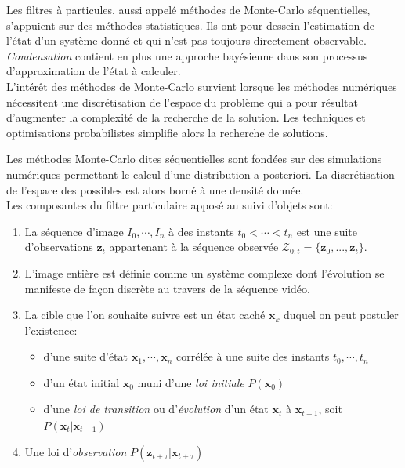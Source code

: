 \documentclass[a4paper,12pt]{report}
\begin{document}
Les filtres à particules, aussi appelé méthodes  de Monte-Carlo séquentielles, s'appuient sur des méthodes statistiques. Ils ont pour dessein l'estimation de l'état d'un système donné et qui n'est pas toujours directement observable.
\textit{Condensation} contient en plus une approche bayésienne dans son processus d'approximation de l'état à calculer.\\

L'intérêt des méthodes de Monte-Carlo survient lorsque les méthodes numériques nécessitent une discrétisation de l'espace du problème qui a pour résultat d'augmenter la complexité de la recherche de la solution. Les techniques et optimisations probabilistes simplifie alors la recherche de solutions.

Les méthodes Monte-Carlo dites séquentielles sont fondées sur des simulations numériques permettant le calcul d'une distribution a posteriori. La discrétisation de l'espace des possibles est alors borné à une densité donnée.\\

Les composantes du filtre particulaire apposé au suivi d'objets sont:
\begin{enumerate}
\item La séquence d'image $I_0,\cdots,I_n$ à des instants $t_0<\cdots<t_n$ est une suite d'observations $\mathbf{z}_t$ appartenant à la séquence observée $ \mathcal{Z}_{0:t}=\{\mathbf{z}_0,...,\mathbf{z}_t\}$.
\item[] L'image entière est définie comme un système complexe dont l'évolution se manifeste de façon discrète au travers de la séquence vidéo.
\item La cible que l'on souhaite suivre est un état caché $\mathbf{x}_k$ duquel on peut postuler l'existence:
	\begin{itemize}
	\item d'une suite d'état $\mathbf{x}_1,\cdots,\mathbf{x}_n$ corrélée à une suite des instants $t_0,\cdots,t_n$ 
	\item d'un état initial $\mathbf{x}_0$ muni d'une \textit{loi initiale}  $P(\mathbf{x}_0)$
	\item d'une \textit{loi de transition} ou d'\textit{évolution} d'un état $\mathbf{x}_t$ à $\mathbf{x}_{t+1}$, soit $P(\mathbf{x}_t|\mathbf{x}_{t-1})$
\end{itemize}
\item Une loi d'\textit{observation} $P(\mathbf{z}_{t+\tau}|\mathbf{x}_{t+\tau})$\\
\end{enumerate}
\end{document}
